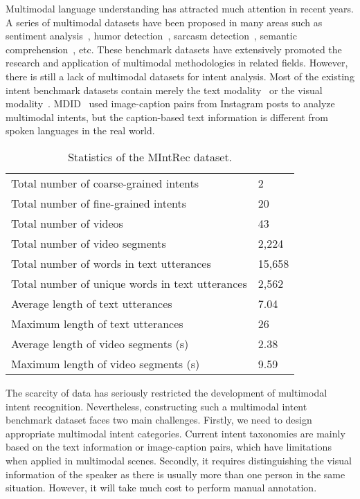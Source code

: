 \documentclass[sigconf,camera-ready]{acmart}
\begin{document}
Multimodal language understanding has attracted much attention in recent years. A series of multimodal datasets have been proposed in many areas such as sentiment analysis~\cite{MOSI, MOSEI, yu-etal-2020-ch}, humor detection~\cite{hasan2021humor}, sarcasm detection~\cite{castro-etal-2019-towards}, semantic comprehension~\cite{wang-etal-2019-youmakeup,yagcioglu-etal-2018-recipeqa}, etc. These benchmark datasets have extensively promoted the research and application of multimodal methodologies in related fields. However, there is still a lack of multimodal datasets for intent analysis. Most of the existing intent benchmark datasets contain merely the text modality~\citep{coucke2018snips, larson2019evaluation, liu2019benchmarking, casanueva2020efficient} or the visual modality~\cite{jia2021intentonomy}.  MDID~\cite{kruk-etal-2019-integrating} used image-caption pairs from Instagram posts to analyze multimodal intents, but the caption-based text information is different from spoken languages in the real world. 
\begin{table}[!htb]\small
	\caption{\label{statistics}  
		Statistics of the MIntRec dataset.}
	\begin{tabular}{ll}
		\toprule
		Total number of coarse-grained intents & 2\\
		Total number of fine-grained intents & 20\\
		Total number of videos  & 43\\
		Total number of video segments  & 2,224\\
		Total number of words in text utterances & 15,658\\
		Total number of unique words in  text utterances & 2,562\\
		Average length of text utterances & 7.04\\
		Maximum length of text utterances & 26\\
		Average length of video segments (s) & 2.38\\
		Maximum length of video segments (s) & 9.59\\
		\bottomrule
	\end{tabular}
\end{table}

The scarcity of data has seriously restricted the development of multimodal intent recognition. Nevertheless, constructing such a multimodal intent benchmark dataset faces two main challenges. Firstly, we need to design appropriate multimodal intent categories. Current intent taxonomies are mainly based on the text information or image-caption pairs, which have limitations when applied in multimodal scenes. Secondly, it requires distinguishing the visual information of the speaker as there is usually more than one person in the same situation. However, it will take much cost to perform manual annotation.  
\end{document}
